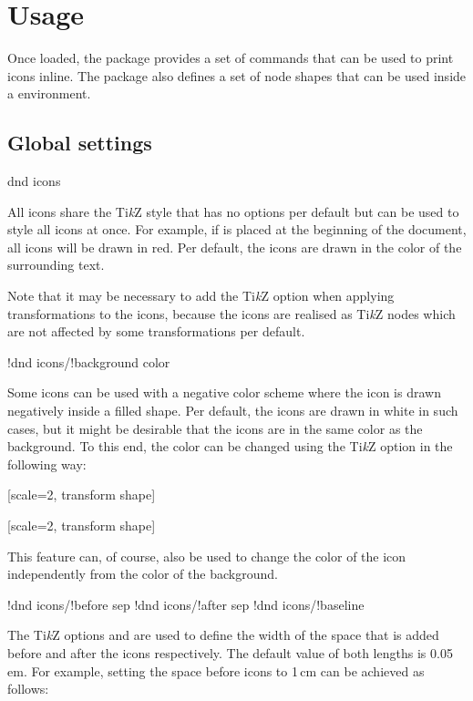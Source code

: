 \documentclass[a4paper]{article}
\begin{document}
\section{Usage}

Once loaded, the package provides a set of commands that can be used to print icons inline. The package also defines a set of node shapes that can be used inside a  environment. 

\subsection{Global settings}

\begin{macrodef}dnd icons\end{macrodef}
All icons share the Ti\emph{k}Z style  that has no options per default but can be used to style all icons at once. For example, if  is placed at the beginning of the document, all icons will be drawn in red. Per default, the icons are drawn in the color of the surrounding text. 

Note that it may be necessary to add the Ti\emph{k}Z option  when applying transformations to the icons, because the icons are realised as Ti\emph{k}Z nodes which are not affected by some transformations per default.

\begin{macrodef}!dnd icons/!background color\end{macrodef}
Some icons can be used with a negative color scheme where the icon is drawn negatively inside a filled shape. Per default, the icons are drawn in white in such cases, but it might be desirable that the icons are in the same color as the background. To this end, the color can be changed using the Ti\emph{k}Z option  in the following way:

\begin{codeexample}
\colorbox{blue!50}{%
        [scale=2, transform shape]%
}

\colorbox{blue!50}{%
        [scale=2, transform shape]%
}
\end{codeexample}
This feature can, of course, also be used to change the color of the icon independently from the color of the background.

\begin{macrodef}
!dnd icons/!before sep
!dnd icons/!after sep
!dnd icons/!baseline
\end{macrodef}
The Ti\emph{k}Z options  and  are used to define the width of the space that is added before and after the icons respectively. The default value of both lengths is 0.05\,em. For example, setting the space before icons to 1\,cm can be achieved as follows:
\end{document}
